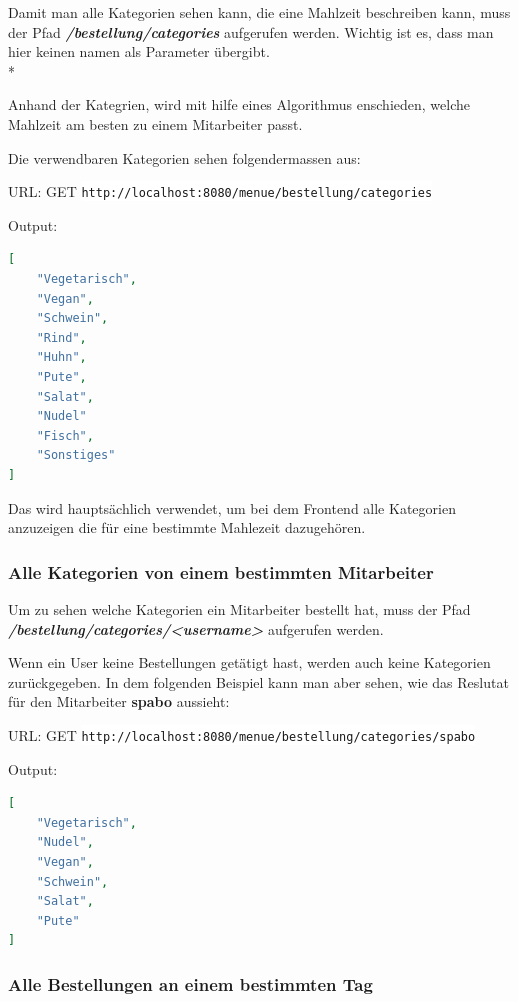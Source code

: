 Damit man alle Kategorien sehen kann, die eine Mahlzeit beschreiben kann, muss der Pfad  \textbf{\textit{/bestellung/categories}} aufgerufen werden.
Wichtig ist es, dass man hier keinen namen als Parameter übergibt. \\*

Anhand der Kategrien, wird mit hilfe eines Algorithmus enschieden, welche Mahlzeit am besten zu einem Mitarbeiter passt. 

Die verwendbaren Kategorien sehen folgendermassen aus:

URL: GET \colorbox{white}{\lstinline[basicstyle=\ttfamily\color{black},language=html]|http://localhost:8080/menue/bestellung/categories|}

Output:

\begin{lstlisting}[language=json,firstnumber=1]
[
    "Vegetarisch",
    "Vegan",
    "Schwein",
    "Rind",
    "Huhn",
    "Pute",
    "Salat",
    "Nudel"
    "Fisch",
    "Sonstiges"
]
\end{lstlisting}

Das wird hauptsächlich verwendet, um bei dem Frontend alle Kategorien anzuzeigen die für eine bestimmte Mahlezeit dazugehören.

\pagebreak

\subsubsection{Alle Kategorien von einem bestimmten Mitarbeiter}

Um zu sehen welche Kategorien ein Mitarbeiter bestellt hat, muss der Pfad \textbf{\textit{/bestellung/categories/<username>}} aufgerufen werden.

Wenn ein User keine Bestellungen getätigt hast, werden auch keine Kategorien zurückgegeben. In dem folgenden Beispiel kann man aber sehen, wie das Reslutat
für den Mitarbeiter \textbf{spabo} aussieht:

URL: GET \colorbox{white}{\lstinline[basicstyle=\ttfamily\color{black},language=html]|http://localhost:8080/menue/bestellung/categories/spabo|}

Output:

\begin{lstlisting}[language=json,firstnumber=1]
[
    "Vegetarisch",
    "Nudel",
    "Vegan",
    "Schwein",
    "Salat",
    "Pute"
]
\end{lstlisting}

\subsubsection{Alle Bestellungen an einem bestimmten Tag}

